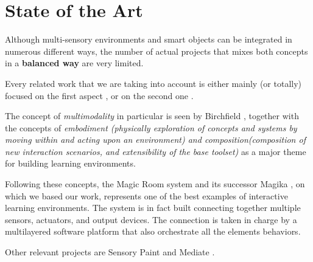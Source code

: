 \chapter{State of the Art}

Although multi-sensory environments and smart objects can be integrated in numerous different ways, the number of actual projects that mixes both concepts in a \textbf{balanced way} are very limited. 

Every related work that we are taking into account is either mainly (or totally) focused on the first aspect \cite{mora-guiard_lands_2016}\cite{ringland_sensorypaint:_2014}\cite{pares_promotion_2005}, or on the second one  \cite{yao_rope_2011}.

The concept of \textit{multimodality} in particular is seen by Birchfield \cite{birchfield_embodiment_2008}, together with the concepts of \textit{embodiment (physically exploration of concepts and systems by moving within and acting upon an environment) and composition(composition of new interaction scenarios, and extensibility of the base toolset)} as a major theme for building learning environments. 

Following these concepts, the Magic Room system \cite{garzotto_magic_2018} and its successor Magika \cite{gelsomini_magika_2019}, on which we based our work, represents one of the best examples of interactive learning environments. The system is in fact built connecting together multiple sensors, actuators, and output devices. 
The connection is taken in charge by a multilayered software platform that also orchestrate all the elements behaviors.

Other relevant projects are Sensory Paint \cite{ringland_sensorypaint:_2014} and Mediate \cite{pares_promotion_2005}.

